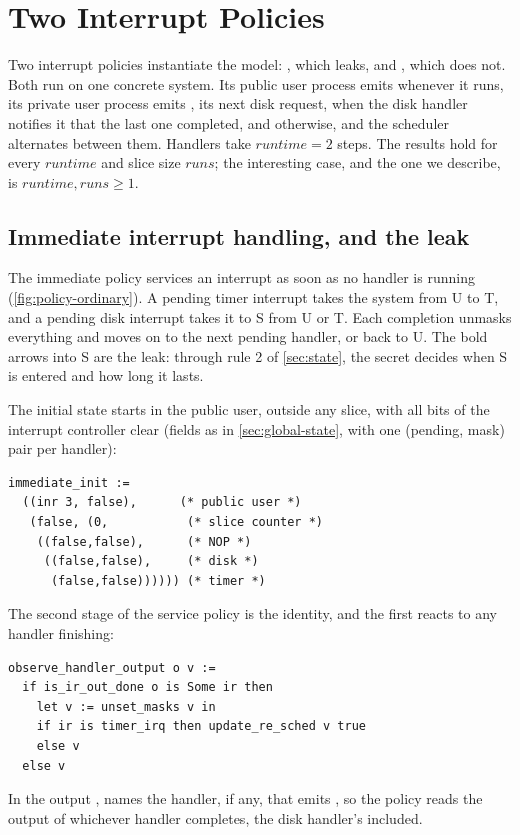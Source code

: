 \section{Two Interrupt Policies}\label{sec:designs}

Two interrupt policies instantiate the model: , which
leaks, and , which does not.
Both run on one concrete system. Its public user process emits
 whenever it runs, its private user process emits , its next disk
request, when the disk handler notifies it that the last one completed, and
 otherwise, and the scheduler alternates between them. Handlers take $\mathit{runtime} = 2$ steps. The results hold
for every $\mathit{runtime}$ and slice size $\mathit{runs}$; the interesting case, and
the one we describe, is $\mathit{runtime}, \mathit{runs} \geq 1$.

\subsection{Immediate interrupt handling, and the leak}\label{sec:leak}

The immediate policy  services an interrupt as soon as no handler is running
(\cref{fig:policy-ordinary}). A pending timer interrupt takes the system from U to T,
and a pending disk interrupt takes it to S from U or T. Each
completion unmasks everything and moves on to the next pending handler, or back to U.
The bold arrows into S are the leak: through rule 2 of \cref{sec:state}, the secret
decides when S is entered and how long it lasts.

The initial state starts in the public user, outside any slice, with all bits of the
interrupt controller clear (fields as in \cref{sec:global-state}, with one (pending,
mask) pair per handler):
\begin{lstlisting}
immediate_init :=
  ((inr 3, false),      (* public user *)
   (false, (0,           (* slice counter *)
    ((false,false),      (* NOP *)
     ((false,false),     (* disk *)
      (false,false)))))) (* timer *)
\end{lstlisting}

The second stage of the service policy is the identity, and the first reacts to any
handler finishing:
\begin{lstlisting}
observe_handler_output o v :=
  if is_ir_out_done o is Some ir then
    let v := unset_masks v in
    if ir is timer_irq then update_re_sched v true
    else v
  else v
\end{lstlisting}
In the output ,  names the handler, if any, that emits
, so the policy reads the output of whichever handler completes, the
disk handler's included.

